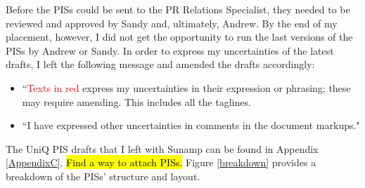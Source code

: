 Before the PISs could be sent to the PR Relations Specialist, they needed to be reviewed and approved by Sandy and, ultimately, Andrew.
By the end of my placement, however, I did not get the opportunity to run the last versions of the PISs by Andrew or Sandy.
In order to express my uncertainties of the latest drafts, I left the following message and amended the drafts accordingly:
\begin{itemize}
    \item ``\textcolor{red}{Texts in red} express my uncertainties in their expression or phrasing; these may require amending. This includes all the taglines.
    \item ``I have expressed other uncertainties in comments in the document markups."
\end{itemize}

The UniQ PIS drafts that I left with Sunamp can be found in Appendix \ref{AppendixC}.
\hl{Find a way to attach PISs.}
Figure \ref{breakdown} provides a breakdown of the PISs' structure and layout.


